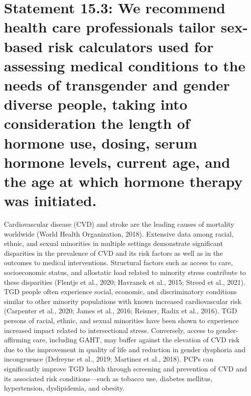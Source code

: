 \documentclass[
]{book}
\begin{document}
\hypertarget{statement-15.3-we-recommend-health-care-professionals-tailor-sex-based-risk-calculators-used-for-assessing-medical-conditions-to-the-needs-of-transgender-and-gender-diverse-people-taking-into-consideration-the-length-of-hormone-use-dosing-serum-hormone-levels-current-age-and-the-age-at-which-hormone-therapy-was-initiated.}{%
\section*{Statement 15.3: We recommend health care professionals tailor sex-based risk calculators used for assessing medical conditions to the needs of transgender and gender diverse people, taking into consideration the length of hormone use, dosing, serum hormone levels, current age, and the age at which hormone therapy was initiated.}\label{statement-15.3-we-recommend-health-care-professionals-tailor-sex-based-risk-calculators-used-for-assessing-medical-conditions-to-the-needs-of-transgender-and-gender-diverse-people-taking-into-consideration-the-length-of-hormone-use-dosing-serum-hormone-levels-current-age-and-the-age-at-which-hormone-therapy-was-initiated.}}

Cardiovascular disease (CVD) and stroke are
the leading causes of mortality worldwide (World
Health Organization, 2018). Extensive data among
racial, ethnic, and sexual minorities in multiple
settings demonstrate significant disparities in the
prevalence of CVD and its risk factors as well as
in the outcomes to medical interventions.
Structural factors such as access to care, socioeconomic status, and allostatic load related to
minority stress contribute to these disparities
(Flentje et al., 2020; Havranek et al., 2015; Streed
et al., 2021). TGD people often experience social,
economic, and discriminatory conditions similar
to other minority populations with known
increased cardiovascular risk (Carpenter et al.,
2020; James et al., 2016; Reisner, Radix et al.,
2016). TGD persons of racial, ethnic, and sexual
minorities have been shown to experience
increased impact related to intersectional stress.
Conversely, access to gender-affirming care,
including GAHT, may buffer against the elevation
of CVD risk due to the improvement in quality
of life and reduction in gender dysphoria and
incongruence (Defreyne et al., 2019; Martinez
et al., 2018). PCPs can significantly improve TGD
health through screening and prevention of CVD
and its associated risk conditions---such as
tobacco use, diabetes mellitus, hypertension, dyslipidemia, and obesity.
\end{document}
